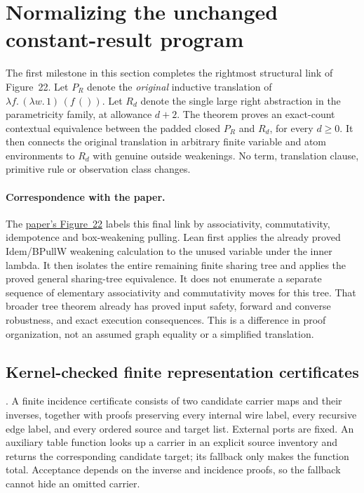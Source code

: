 \clearpage
\section{Normalizing the unchanged constant-result program}
\label{sec:proposition-result-normalization}
The first milestone in this section completes the rightmost structural link
of Figure~22. Let $P_R$ denote the \emph{original} inductive translation of
$\lambda f.\,(\lambda w.\,1)\,(f\,())$. Let $R_d$ denote the single large
right abstraction in the parametricity family, at allowance $d+2$.
The theorem proves an exact-count contextual equivalence between the padded
closed $P_R$ and $R_d$, for every $d\geq0$. It then connects the original
translation in arbitrary finite variable and atom environments to $R_d$
with genuine outside weakenings. No term, translation clause, primitive
rule or observation class changes.

\paragraph{Correspondence with the paper.}
The \href{https://arxiv.org/html/1907.01257v5\#S12.SS3}{paper's Figure~22}
labels this final link by associativity, commutativity, idempotence and
box-weakening pulling. Lean first applies the already proved Idem/BPullW
weakening calculation to the unused variable under the inner lambda. It
then isolates the entire remaining finite sharing tree and applies the
proved general sharing-tree equivalence. It does not enumerate a separate
sequence of elementary associativity and commutativity moves for this tree.
That broader tree theorem already has proved input safety, forward and
converse robustness, and exact execution consequences. This is a difference
in proof organization, not an assumed graph equality or a simplified translation.

\subsection{Kernel-checked finite representation certificates}
.
A finite incidence certificate consists of two candidate carrier maps and
their inverses, together with proofs preserving every internal wire label,
every recursive edge label, and every ordered source and target list. External
ports are fixed. An auxiliary table function looks up a carrier in an explicit
source inventory and returns the corresponding candidate target; its fallback
only makes the function total. Acceptance depends on the inverse and incidence
proofs, so the fallback cannot hide an omitted carrier.

